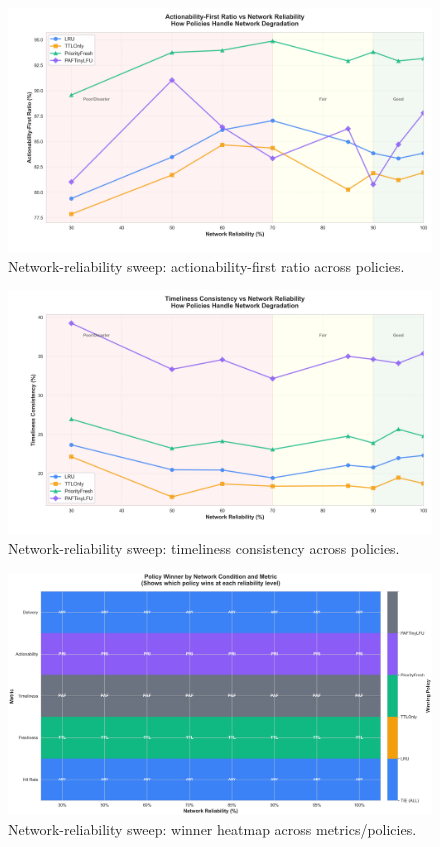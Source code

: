 \documentclass[11pt,twocolumn]{article}
\begin{document}
\begin{figure}[h]
    \centering
    \includegraphics[width=\linewidth]{figures/network_reliability_actionabilityFirstRatio.png}
    \caption{Network-reliability sweep: actionability-first ratio across policies.}
    \label{fig:network-actionability}
\end{figure}

\begin{figure}[h]
    \centering
    \includegraphics[width=\linewidth]{figures/network_reliability_timelinessConsistency.png}
    \caption{Network-reliability sweep: timeliness consistency across policies.}
    \label{fig:network-timeliness}
\end{figure}

\begin{figure}[h]
    \centering
    \includegraphics[width=\linewidth]{figures/network_winner_heatmap.png}
    \caption{Network-reliability sweep: winner heatmap across metrics/policies.}
    \label{fig:network-winner-heatmap}
\end{figure}
\end{document}
